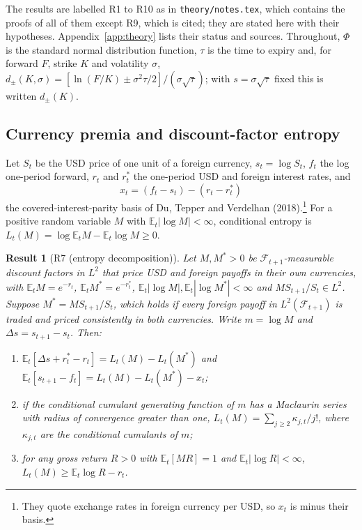 \documentclass[11pt]{article}
\theoremstyle{result}
\newtheorem*{result}{Result}
\newcommand{\E}{\mathbb{E}}
\newcommand{\D}{\Delta}
\begin{document}
The results are labelled R1 to R10 as in \texttt{theory/notes.tex}, which contains the proofs of all of them except R9, which is cited; they are stated here with their hypotheses. Appendix~\ref{app:theory} lists their status and sources. Throughout, $\Phi$ is the standard normal distribution function, $\tau$ is the time to expiry and, for forward $F$, strike $K$ and volatility $\sigma$, $d_\pm(K,\sigma)=[\ln(F/K)\pm\sigma^2\tau/2]/(\sigma\sqrt\tau)$; with $s=\sigma\sqrt\tau$ fixed this is written $d_\pm(K)$.

\subsection{Currency premia and discount-factor entropy}

Let $S_t$ be the USD price of one unit of a foreign currency, $s_t=\log S_t$, $f_t$ the log one-period forward, $r_t$ and $r^*_t$ the one-period USD and foreign interest rates, and
\begin{equation}\label{eq:basis}
x_t=(f_t-s_t)-(r_t-r^*_t)
\end{equation}
the covered-interest-parity basis of Du, Tepper and Verdelhan (2018).\footnote{They quote exchange rates in foreign currency per USD, so $x_t$ is minus their basis.} For a positive random variable $M$ with $\E_t|\log M|<\infty$, conditional entropy is $L_t(M)=\log\E_tM-\E_t\log M\ge0$.

\begin{result}[R7 (entropy decomposition)]
Let $M,M^*>0$ be $\mathcal F_{t+1}$-measurable discount factors in $L^2$ that price USD and foreign payoffs in their own currencies, with $\E_tM=e^{-r_t}$, $\E_tM^*=e^{-r^*_t}$, $\E_t|\log M|,\E_t|\log M^*|<\infty$ and $MS_{t+1}/S_t\in L^2$. Suppose $M^*=MS_{t+1}/S_t$, which holds if every foreign payoff in $L^2(\mathcal F_{t+1})$ is traded and priced consistently in both currencies. Write $m=\log M$ and $\D s=s_{t+1}-s_t$. Then:
\begin{enumerate}
\item[(i)] $\E_t[\D s+r^*_t-r_t]=L_t(M)-L_t(M^*)$ and $\E_t[s_{t+1}-f_t]=L_t(M)-L_t(M^*)-x_t$;
\item[(ii)] if the conditional cumulant generating function of $m$ has a Maclaurin series with radius of convergence greater than one, $L_t(M)=\sum_{j\ge2}\kappa_{j,t}/j!$, where $\kappa_{j,t}$ are the conditional cumulants of $m$;
\item[(iii)] for any gross return $R>0$ with $\E_t[MR]=1$ and $\E_t|\log R|<\infty$, $L_t(M)\ge\E_t\log R-r_t$.
\end{enumerate}
\end{result}
\end{document}
